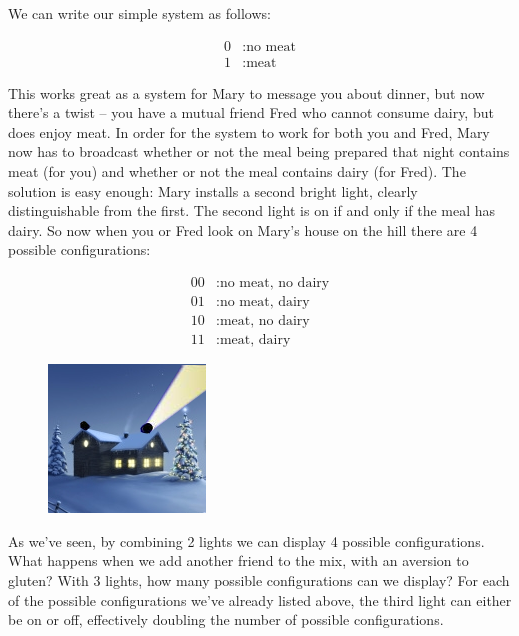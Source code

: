 \documentclass[UTF8]{book}
\begin{document}
\begin{CJK}{UTF8}{gbsn}
We can write our simple system as follows:

\begin{align*}
	0&: \text{no meat} \\
	1&: \text{meat}
\end{align*}

This works great as a system for Mary to message you about dinner, but now there's a twist -- you have a mutual friend Fred who cannot consume dairy, but does enjoy meat. In order for the system to work for both you and Fred, Mary now has to broadcast whether or not the meal being prepared that night contains meat (for you) and whether or not the meal contains dairy (for Fred). The solution is easy enough: Mary installs a second bright light, clearly distinguishable from the first. The second light is on if and only if the meal has dairy. So now when you or Fred look on Mary's house on the hill there are 4 possible configurations:

\begin{align*}
	00&: \text{no meat, no dairy} \\
	01&: \text{no meat, dairy} \\
	10&: \text{meat, no dairy} \\
	11&: \text{meat, dairy}
\end{align*}

\begin{figure}[H]
\captionsetup{labelformat=empty}
\centering
\includegraphics[width=0.25\linewidth]{house_on_hill_01}
\end{figure}

As we've seen, by combining 2 lights we can display 4 possible configurations. What happens when we add another friend to the mix, with an aversion to gluten? With 3 lights, how many possible configurations can we display? For each of the possible configurations we've already listed above, the third light can either be on or off, effectively doubling the number of possible configurations.


\end{CJK}
\end{document}
